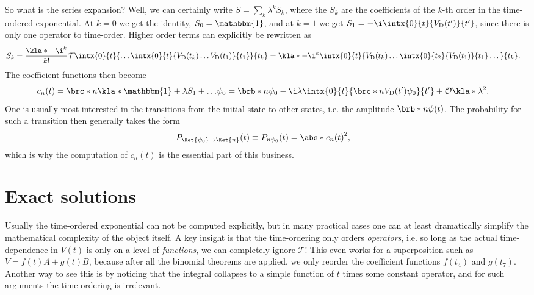 \documentclass[english, parskip=full]{scrartcl}
\newcommand{\D}{\text{D}}
\begin{document}
So what is the series expansion?
Well, we can certainly write $S=\sum_k \lambda^k S_k$, where the $S_k$ are the coefficients of the $k$-th order in the time-ordered exponential.
At $k=0$ we get the identity, $S_0=\mathbbm{1}$, and at $k=1$ we get $S_1=-\i \intx{0}{t}{V_\D(t')}{t'}$, since there is only one operator to time-order.
Higher order terms can explicitly be rewritten as
\begin{align}
S_k &= \frac{\kla*{-\i}^k}{k!} \mathcal{T} \intx{0}{t}{ \dots \intx{0}{t}{V_\D(t_k) \dots V_\D(t_1) }{t_1}}{t_k} = \kla*{-\i}^k \intx{0}{t}{V_\D(t_k) \dots\intx{0}{t_2}{V_\D(t_1)}{t_1}\dots }{t_k}.
\end{align}
The coefficient functions then become 
\begin{align}
c_n(t) &= \brc*{n}{\kla*{\mathbbm{1} + \lambda S_1 + \dots}}{\psi_0} = \brb*{n}{\psi_0} - \i \lambda \intx{0}{t}{\brc*{n}{V_\D(t')}{\psi_0}}{t'} + \mathcal{O}\kla*{\lambda^2}.
\end{align}
One is usually most interested in the transitions from the initial state to other states, i.e. the amplitude $\brb*{n}{\psi(t)}$.
The probability for such a transition then generally takes the form
\begin{align}
P_{\Ket{\psi_0} \rightarrow \Ket{n}}(t) &\equiv P_{n\psi_0}(t) = \abs*{ c_n(t) }^2,
\end{align}
which is why the computation of $c_n(t)$ is the essential part of this business.
\section{Exact solutions}
Usually the time-ordered exponential can not be computed explicitly, but in many practical cases one can at least dramatically simplify the mathematical complexity of the object itself.
A key insight is that the time-ordering only orders \emph{operators}, i.e. so long as the actual time-dependence in $V(t)$ is only on a level of \emph{functions}, we can completely ignore $\mathcal{T}$!
This even works for a superposition such as $V=f(t)A+g(t)B$, because after all the binomial theorems are applied, we only reorder the coefficient functions $f(t_4)$ and $g(t_7)$.
Another way to see this is by noticing that the integral collapses to a simple function of $t$ times some constant operator, and for such arguments the time-ordering is irrelevant.
\end{document}
